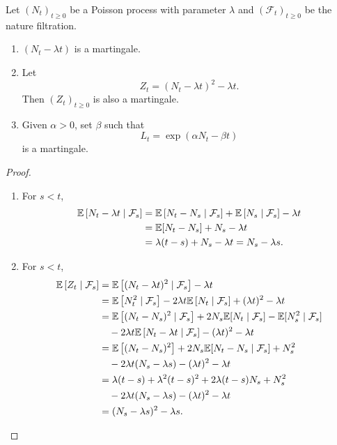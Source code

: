 \begin{exam}
    Let $(N_t)_{t \geq 0}$ be a Poisson process with parameter $\lambda$ and $(\mathcal{F}_t)_{t \geq 0}$ be the nature filtration.
    \begin{enumerate}[label=(\arabic{*})]
        \item $(N_t - \lambda t)$ is a martingale.
        \item Let
        \begin{equation*}
            Z_t = (N_t - \lambda t)^2 - \lambda t.
        \end{equation*}
        Then $(Z_t)_{t \geq 0}$ is also a martingale.
        \item Given $\alpha > 0$, set $\beta$ such that
        \begin{equation*}
            L_t = \exp (\alpha N_t - \beta t)
        \end{equation*}
        is a martingale.
    \end{enumerate}
    \begin{proof}
        \begin{enumerate}[label=(\arabic{*})]
            \item For $s < t$,
            \begin{align*}
                \mathbb{E}\left[ N_t - \lambda t \mid \mathcal{F}_s\right] & = \mathbb{E}\left[ N_t - N_s \mid \mathcal{F}_s\right] + \mathbb{E}\left[N_s \mid \mathcal{F}_s\right] -\lambda t \\
                &= \mathbb{E}[N_t - N_s] + N_s - \lambda t\\
                &= \lambda (t - s) + N_s - \lambda t = N_s - \lambda s.
            \end{align*}

            \item For $s < t$,
            \begin{align*}
                \mathbb{E}\left[Z_t \mid \mathcal{F}_s\right] & = \mathbb{E}\left[(N_t - \lambda t)^2 \mid \mathcal{F}_s\right] - \lambda t\\
                &= \mathbb{E}\left[N_t^2 \mid \mathcal{F}_s\right] - 2\lambda t \mathbb{E}\left[N_t \mid \mathcal{F}_s\right] + (\lambda t)^2 -  \lambda t \\
                &= \mathbb{E}\left[(N_t - N_s)^2 \mid \mathcal{F}_s\right] + 2N_s \mathbb{E}[N_t \mid \mathcal{F}_s] - \mathbb{E}[N_s^2 \mid \mathcal{F}_s] \\
                &\quad  - 2\lambda t \mathbb{E}\left[N_t - \lambda t \mid \mathcal{F}_s\right] -(\lambda t)^2 - \lambda t \\
                &= \mathbb{E}\left[(N_t - N_s)^2\right] + 2N_s \mathbb{E}[N_t - N_s \mid \mathcal{F}_s] + N_s^2 \\
                &\quad -2\lambda t (N_s - \lambda s) - (\lambda t)^2 - \lambda t \\
                &= \lambda (t-s) + \lambda^2(t-s)^2 + 2\lambda (t-s) N_s + N_s^2 \\
                &\quad - 2\lambda t (N_s - \lambda s) - (\lambda t)^2 - \lambda t \\
                &= (N_s - \lambda s)^2 - \lambda s.
            \end{align*}


\end{enumerate}
\end{proof}
\end{exam}
